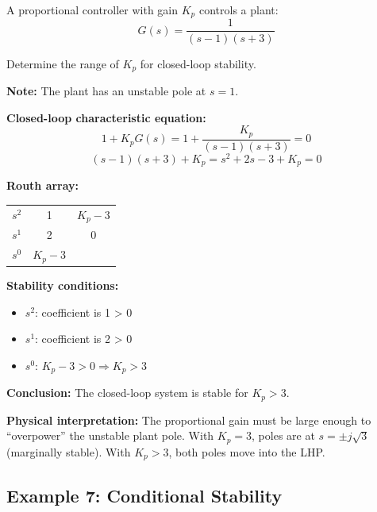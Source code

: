 \begin{example}
\label{ex:feedback_stability}
A proportional controller with gain $K_p$ controls a plant:
\begin{equation}
G(s) = \frac{1}{(s-1)(s+3)}
\end{equation}

Determine the range of $K_p$ for closed-loop stability.

\textbf{Note:} The plant has an unstable pole at $s = 1$.

\textbf{Closed-loop characteristic equation:}
\begin{equation}
1 + K_p G(s) = 1 + \frac{K_p}{(s-1)(s+3)} = 0
\end{equation}
\begin{equation}
(s-1)(s+3) + K_p = s^2 + 2s - 3 + K_p = 0
\end{equation}

\textbf{Routh array:}
\begin{center}
\begin{tabular}{c|cc}
$s^2$ & 1 & $K_p - 3$ \\
$s^1$ & 2 & 0 \\
$s^0$ & $K_p - 3$ &
\end{tabular}
\end{center}

\textbf{Stability conditions:}
\begin{itemize}
    \item $s^2$: coefficient is 1 > 0 \checkmark
    \item $s^1$: coefficient is 2 > 0 \checkmark
    \item $s^0$: $K_p - 3 > 0 \Rightarrow K_p > 3$
\end{itemize}

\textbf{Conclusion:} The closed-loop system is stable for $K_p > 3$.

\textbf{Physical interpretation:} The proportional gain must be large enough to ``overpower'' the unstable plant pole. With $K_p = 3$, poles are at $s = \pm j\sqrt{3}$ (marginally stable). With $K_p > 3$, both poles move into the LHP.
\end{example}

\subsection{Example 7: Conditional Stability}

